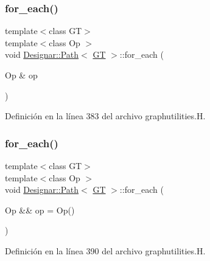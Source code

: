 \subsubsection{\texorpdfstring{for\+\_\+each()}{for\_each()}\hspace{0.1cm}{\footnotesize\ttfamily [3/4]}}
{\footnotesize\ttfamily template$<$class GT$>$ \\
template$<$class Op $>$ \\
void \hyperlink{class_designar_1_1_path}{Designar\+::\+Path}$<$ \hyperlink{demo-buildgraph_8_c_a3001c40d2c31ca87ed96cd7d1334a55e}{GT} $>$\+::for\+\_\+each (\begin{DoxyParamCaption}\item[{Op \&}]{op }\end{DoxyParamCaption})\hspace{0.3cm}{\ttfamily [inline]}}



Definición en la línea 383 del archivo graphutilities.\+H.

\mbox{\label{class_designar_1_1_path_aaab972fd915daa207a31f6832a691ef7}} 
\subsubsection{\texorpdfstring{for\+\_\+each()}{for\_each()}\hspace{0.1cm}{\footnotesize\ttfamily [4/4]}}
{\footnotesize\ttfamily template$<$class GT$>$ \\
template$<$class Op $>$ \\
void \hyperlink{class_designar_1_1_path}{Designar\+::\+Path}$<$ \hyperlink{demo-buildgraph_8_c_a3001c40d2c31ca87ed96cd7d1334a55e}{GT} $>$\+::for\+\_\+each (\begin{DoxyParamCaption}\item[{Op \&\&}]{op = {\ttfamily Op()} }\end{DoxyParamCaption})\hspace{0.3cm}{\ttfamily [inline]}}



Definición en la línea 390 del archivo graphutilities.\+H.

\mbox{\label{class_designar_1_1_path_a24e7befc93ee9a9db24768f0d3c6ad22}} 
